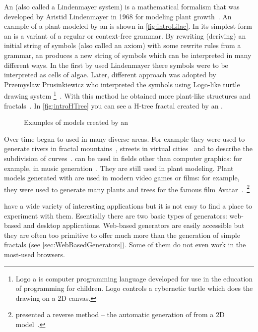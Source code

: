 
\label{sec:Introduction}

An \lsystem (also called a Lindenmayer system) is a mathematical formalism that was developed by Aristid Lindenmayer in 1968 for modeling plant growth~\cite{Lin68}.
An example of a plant modeled by an \lsystem is shown in \autoref{fig:introLilac}.
In its simplest form an \lsystem is a variant of a regular or \mbox{context-free} grammar.
By rewriting (deriving) an initial string of symbols (also called an axiom) with some rewrite rules from a grammar, an \lsystem produces a new string of symbols which can be interpreted in many different ways.
In the first \lsystems by used Lindenmayer there symbols were to be interpreted as cells of algae.
Later, different approach was adopted by Przemyslaw Prusinkiewicz who interpreted the \lsystem symbols using \mbox{Logo-like} turtle drawing system%
	\footnote{Logo a is computer programming language developed for use in the education of programming for children.
	Logo controls a cybernetic turtle which does the drawing on a 2D canvas.}~\cite{Pru85}.
With this method he obtained more plant-like structures and fractals~\cite{CD93}.
In \autoref{fig:introHTree} you can see a H-tree fractal created by an \lsystem.

\begin{figure}[h!]
	 \hfill
	\caption{Examples of models created by an \lsystem}
\end{figure}


Over time \lsystems began to used in many diverse areas.
For example they were used to generate rivers in fractal mountains~\cite{PH93}, streets in virtual cities~\cite{PM01} and to describe the subdivision of curves~\cite{PSSK03}.
\lsystems can be used in fields other than computer graphics: for example, in music generation~\cite{HCJ99, Man06}.
They are still used in plant modeling.
Plant models generated with \lsystems are used in modern video games or films: for example, they were used to generate many plants and trees for the famous film Avatar~\cite{Wor08, Dun10}.~\footnote{\citeauthor{SBM10} presented a reverse method -- the automatic generation of \lsystems from a 2D model~\cite{SBM10}.}

\lsystems have a wide variety of interesting applications but it is not easy to find a place to experiment with them.
Esentially there are two basic types of \lsystem generators: web-based and desktop applications.
Web-based \lsystem generators are easily accessible but they are often too primitive to offer much more than the generation of simple fractals (see \autoref{sec:WebBasedGenerators}).
Some of them do not even work in the most-used browsers.

